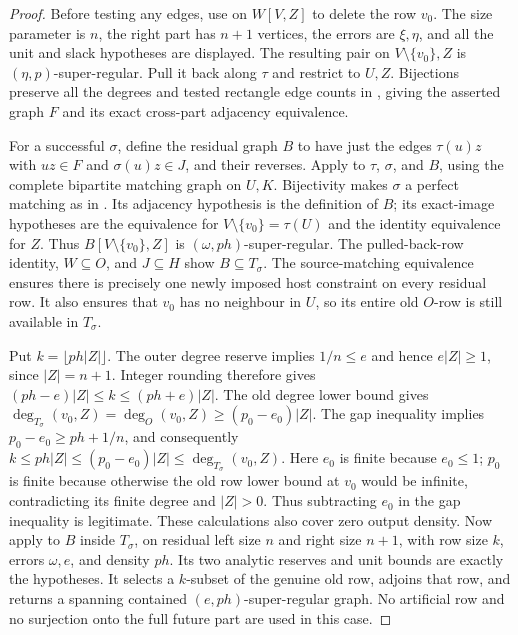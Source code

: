 \begin{proof}
Before testing any edges, use 
on $W[V,Z]$ to delete the row $v_0$. The size parameter is $n$, the
right part has $n+1$ vertices, the errors are $\xi,\eta$, and all the
unit and slack hypotheses are displayed. The resulting pair on
$V\setminus\{v_0\},Z$ is $(\eta,p)$-super-regular.
Pull it back along $\tau$ and restrict to $U,Z$. Bijections preserve
all the degrees and tested rectangle edge counts in
, giving the asserted graph $F$ and its
exact cross-part adjacency equivalence.

For a successful $\sigma$, define the residual graph $B$ to have just
the edges $\tau(u)z$ with $uz\in F$ and $\sigma(u)z\in J$, and their
reverses. Apply  to
$\tau$, $\sigma$, and $B$, using the complete bipartite matching graph
on $U,K$. Bijectivity makes $\sigma$ a perfect matching as in
. Its adjacency hypothesis is the definition
of $B$; its exact-image hypotheses are the equivalence for
$V\setminus\{v_0\}=\tau(U)$ and the identity equivalence for $Z$.
Thus $B[V\setminus\{v_0\},Z]$ is $(\omega,ph)$-super-regular.
The pulled-back-row identity, $W\subseteq O$, and $J\subseteq H$
show $B\subseteq T_\sigma$. The source-matching equivalence ensures
there is precisely one newly imposed host constraint on every residual
row. It also ensures that $v_0$ has no neighbour in $U$, so its entire
old $O$-row is still available in $T_\sigma$.

Put $k=\lfloor ph|Z|\rfloor$. The outer degree reserve implies
$1/n\le e$ and hence $e|Z|\ge1$, since $|Z|=n+1$.
Integer rounding therefore gives
$(ph-e)|Z|\le k\le(ph+e)|Z|$.
The old degree lower bound gives
$\deg_{T_\sigma}(v_0,Z)=\deg_O(v_0,Z)\ge(p_0-e_0)|Z|$.
The gap inequality implies $p_0-e_0\ge ph+1/n$, and consequently
$k\le ph|Z|\le(p_0-e_0)|Z|\le\deg_{T_\sigma}(v_0,Z)$.
Here $e_0$ is finite because $e_0\le1$; $p_0$ is finite because otherwise
the old row lower bound at $v_0$ would be infinite, contradicting its
finite degree and $|Z|>0$. Thus subtracting $e_0$ in the gap inequality
is legitimate. These calculations also cover zero output density.
Now apply  to $B$ inside
$T_\sigma$, on residual left size $n$ and right size $n+1$, with
row size $k$, errors $\omega,e$, and density $ph$. Its two analytic
reserves and unit bounds are exactly the hypotheses. It selects a
$k$-subset of the genuine old row, adjoins that row, and returns a
spanning contained $(e,ph)$-super-regular graph. No artificial row and
no surjection onto the full future part are used in this case.
\end{proof}
